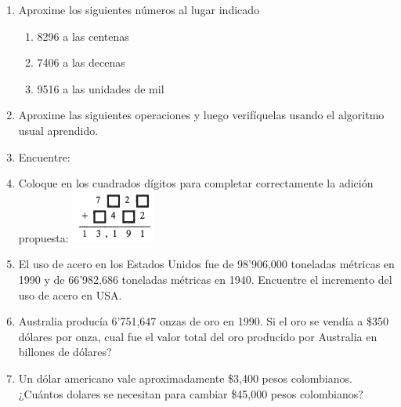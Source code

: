 \documentclass[twoside]{article}
\begin{document}
\begin{enumerate}
\begin{enumerate}
\end{enumerate}
 \item Aproxime los siguientes números al lugar indicado
\begin{enumerate}
\item 8296 a las centenas
\item 7406 a las decenas
\item 9516 a las unidades de mil
\end{enumerate} 
\item Aproxime las siguientes operaciones y luego verifíquelas usando el algoritmo usual aprendido.
\begin{enumerate}
\end{enumerate}
\item Encuentre:
\begin{enumerate}
\end{enumerate}
\item Coloque en los cuadrados dígitos para completar correctamente la adición propuesta:
\includegraphics[scale=.75]{Images/adicion.png} 
\item El uso de acero en los Estados Unidos fue de 98'906,000 toneladas métricas en 1990 y de 66'982,686 toneladas métricas en 1940. Encuentre el incremento del uso de acero en USA.
\item Australia producía 6'751,647 onzas de oro en 1990. Si el oro se vendía a \$350 dólares por onza, cual fue el valor total del oro producido por Australia en billones de dólares?
\item Un dólar americano vale aproximadamente \$3,400 pesos colombianos. ¿Cuántos dolares se necesitan para cambiar \$45,000 pesos colombianos?
\end{enumerate}
\end{document}
